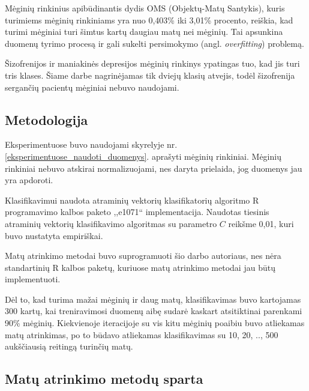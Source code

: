 Mėginių rinkinius apibūdinantis dydis OMS (Objektų-Matų Santykis), kuris turimiems mėginių rinkiniams yra nuo 0,403\% iki 3,01\% procento, reiškia, kad turimi mėginiai turi šimtus kartų daugiau matų nei mėginių. Tai apsunkina duomenų tyrimo procesą ir gali sukelti persimokymo (angl. \textit{overfitting}) problemą.

Šizofrenijos ir maniakinės depresijos mėginių rinkinys ypatingas tuo, kad jis turi tris klases. Šiame darbe nagrinėjamas tik dviejų klasių atvejis, todėl šizofrenija sergančių pacientų mėginiai nebuvo naudojami.

\subsection{Metodologija}

Eksperimentuose buvo naudojami skyrelyje nr. \ref{eksperimentuose_naudoti_duomenys}. aprašyti mėginių rinkiniai. Mėginių rinkiniai nebuvo atskirai normalizuojami, nes daryta prielaida, jog duomenys jau yra apdoroti. 

Klasifikavimui naudota atraminių vektorių klasifikatorių algoritmo R programavimo kalbos paketo ,,e1071`` implementacija. Naudotas tiesinis atraminių vektorių klasifikavimo algoritmas su parametro $C$ reikšme 0,01, kuri buvo nustatyta empiriškai.

Matų atrinkimo metodai buvo suprogramuoti šio darbo autoriaus, nes nėra standartinių R kalbos paketų, kuriuose matų atrinkimo metodai jau būtų implementuoti.

Dėl to, kad turima mažai mėginių ir daug matų, klasifikavimas buvo kartojamas 300 kartų, kai treniravimosi duomenų aibę sudarė kaskart atsitiktinai parenkami 90\% mėginių. Kiekvienoje iteracijoje su vis kitu mėginių poaibiu buvo atliekamas matų atrinkimas, po to būdavo atliekamas klasifikavimas su 10, 20, .., 500 aukščiausią reitingą turinčių matų.

\subsection{Matų atrinkimo metodų sparta}

